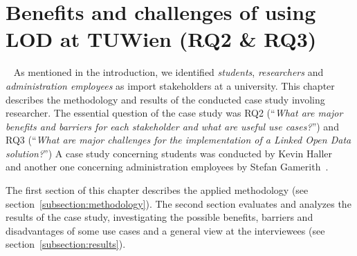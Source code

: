 \section{Benefits and challenges of using LOD at TUWien (RQ2 \& RQ3)}~\label{section:benefits}
As mentioned in the introduction, we identified \textit{students}, \textit{researchers} and \textit{administration employees} as import stakeholders at a university. This chapter describes the methodology and results of the conducted case study involing researcher. The essential question of the case study was RQ2 (``\textit{What are major benefits and barriers for each stakeholder and what are useful use cases?}'') and RQ3 (``\textit{What are major challenges for the implementation of a Linked Open Data solution?}'') 
A case study concerning students was conducted by Kevin Haller~\cite{article:haller_publishing_2016} and another one concerning administration employees by Stefan Gamerith~\cite{article:gamerith_publishing_2016}.

The first section of this chapter describes the applied methodology (see section~\ref{subsection:methodology}). The second section evaluates and analyzes the results of the case study, investigating the possible benefits, barriers and disadvantages of some use cases and a general view at the interviewees (see section~\ref{subsection:results}).


\newpage


